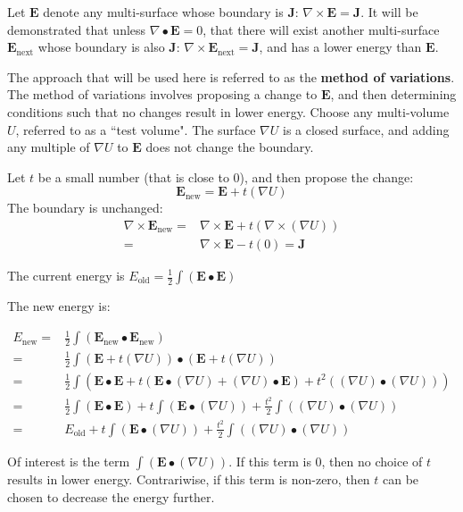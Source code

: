 Let \(\mathbf{E}\) denote any multi-surface whose boundary is \(\mathbf{J}\): \(\nabla \times \mathbf{E} = \mathbf{J}\). It will be demonstrated that unless \(\nabla \bullet \mathbf{E} = 0\), that there will exist another multi-surface \(\mathbf{E}_{\text{next}}\) whose boundary is also \(\mathbf{J}\): \(\nabla \times \mathbf{E}_{\text{next}} = \mathbf{J}\), and has a lower energy than \(\mathbf{E}\). 

The approach that will be used here is referred to as the {\bf method of variations}. The method of variations involves proposing a change to \(\mathbf{E}\), and then determining conditions such that no changes result in lower energy. Choose any multi-volume \(U\), referred to as a ``test volume". The surface \(\nabla U\) is a closed surface, and adding any multiple of \(\nabla U\) to \(\mathbf{E}\) does not change the boundary.

Let \(t\) be a small number (that is close to 0), and then propose the change:
\[\mathbf{E}_{\text{new}} = \mathbf{E} + t(\nabla U)\]
The boundary is unchanged:
\begin{align*}
\nabla \times \mathbf{E}_{\text{new}} = & \nabla \times \mathbf{E} + t(\nabla \times (\nabla U)) \\ 
= & \nabla \times \mathbf{E} - t(0) 
= \mathbf{J}
\end{align*}

The current energy is \(E_{\text{old}} = \frac{1}{2}\int (\mathbf{E} \bullet \mathbf{E})\)

The new energy is: 

\begin{align*}
E_{\text{new}} = & \frac{1}{2}\int (\mathbf{E}_{\text{new}} \bullet \mathbf{E}_{\text{new}}) \\ 
= & \frac{1}{2}\int (\mathbf{E} + t (\nabla U)) \bullet (\mathbf{E} + t (\nabla U)) \\ 
= & \frac{1}{2}\int (\mathbf{E} \bullet \mathbf{E} + t(\mathbf{E} \bullet (\nabla U) + (\nabla U) \bullet \mathbf{E}) + t^2((\nabla U) \bullet (\nabla U))) \\
= & \frac{1}{2}\int (\mathbf{E} \bullet \mathbf{E}) + t\int (\mathbf{E} \bullet (\nabla U)) + \frac{t^2}{2}\int ((\nabla U) \bullet (\nabla U)) \\ 
= & E_{\text{old}} + t\int (\mathbf{E} \bullet (\nabla U)) + \frac{t^2}{2}\int ((\nabla U) \bullet (\nabla U))
\end{align*}

Of interest is the term \(\int (\mathbf{E} \bullet (\nabla U))\). If this term is \(0\), then no choice of \(t\) results in lower energy. Contrariwise, if this term is non-zero, then \(t\) can be chosen to decrease the energy further. 

